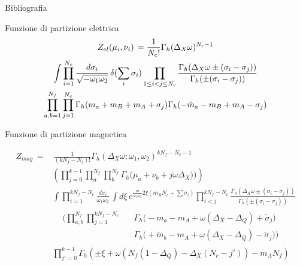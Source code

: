 \documentclass[10pt,compress,usenames,dvipsnames]{beamer}
\begin{document}


\begin{frame}{Bibliografia}
\nocite{*}
{ \footnotesize

}
\end{frame}

\begin{frame}{Funzione di partizione elettrica}
\begin{multline*}
Z_{el} ( \mu_i , \nu_i )\,  =  
 {1 \over N_c ! }
\Gamma_h ( \Delta_X \omega )^{N_c-1} 
\\ \int
\prod_{i=1}^{N_c} \frac{d \sigma_i}{\sqrt{- \omega_1 \omega_2}} \, \delta( \sum_i \sigma_i)  
	 \prod_{ 1 \leq i<j \leq N_c} \frac{ \Gamma_h( \Delta_X \omega \pm (\sigma_i - \sigma_j)) }{ \Gamma_h ( \pm (\sigma_i - \sigma_j) )}\\
 \prod_{a,b=1}^{N_f} \prod_{j=1}^{N_c} \Gamma_h ( m_a + m_B + m_A + \sigma_j) \Gamma_h ( -\tilde{m}_a -m_B + m_A - \sigma_j)
\end{multline*}

\end{frame}

\begin{frame}{Funzione di partizione magnetica}

\vspace{-1cm}
\begin{equation*}
\begin{aligned}
Z_{mag} %
\,= & \, \frac{1}{(k N_f - N_c)!}
 \Gamma_h ( \Delta_X \omega ; \omega_1 , \omega_2)^{ k N_f - N_c -1}  \\
 &  \left( \prod_{j=0}^{k-1}
\prod_a^{N_f } \prod_b^{N_f}  \Gamma_h \big( \mu_a+  \nu_b + j \omega \Delta_X) \big)  \right) \\
&\int  \prod_{i=1}^{ k N_f - N_c } \frac{d \sigma_i }{ \omega_1 \omega_2} \,\int
d \xi \, e^{ \frac{\pi i }{ \omega_1 \omega_2} 2 \xi  \left( m_B N_c + \sum \sigma_i \right)}  
\prod_{i<j}^{k N_f - N_c } \frac{ \Gamma_h( \Delta_X \omega \pm (\sigma_i - \sigma_j)) }{ \Gamma_h ( \pm (\sigma_i - \sigma_j) )}
	\\&
\begin{aligned}
	 &  \bigg( \prod_{a,b}^{N_f} \prod_{j=1}^{k N_f - N_c }
	 && \Gamma_h \big( - m_a - m_A + \omega (\Delta_X - \Delta_Q)  + \tilde{\sigma}_j \big) \\
 & && \Gamma_h \big(  + \tilde{m}_b - m_A + \omega (\Delta_X - \Delta_Q)  - \tilde{\sigma}_j \big)  \bigg)
	\end{aligned}
	\\
	& \prod_{j'=0}^{k-1} \Gamma_h \left( \pm {\xi} +\omega \left(
	N_f ( 1 - \Delta_Q ) - \Delta_X ( N_c - j')  \right) - m_A N_f
 \right)
\end{aligned}
\end{equation*}

\end{frame}
\end{document}
